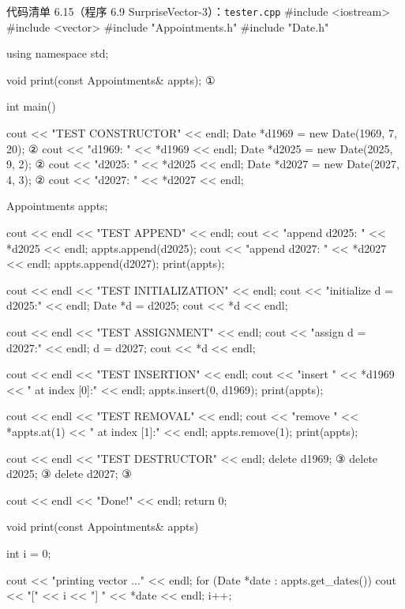 \begin{codeboxt}{代码清单 6.15（程序 6.9 SurpriseVector-3）：\texttt{tester.\allowbreak{}cpp}}
#include <iostream>
#include <vector>
#include "Appointments.h"
#include "Date.h"

using namespace std;

void print(const Appointments& appts);         ①

int main()
{
    cout << "TEST CONSTRUCTOR" << endl;
    Date *d1969 = new Date(1969,  7, 20);      ②
    cout << "d1969: " << *d1969 << endl;
    Date *d2025 = new Date(2025,  9,  2);      ②
    cout << "d2025: " << *d2025 << endl;
    Date *d2027 = new Date(2027,  4,  3);      ②
    cout << "d2027: " << *d2027 << endl;

    Appointments appts;

    cout << endl << "TEST APPEND" << endl;
    cout << "append d2025: " << *d2025 << endl;
    appts.append(d2025);
    cout << "append d2027: " << *d2027 << endl;
    appts.append(d2027);
    print(appts);

    cout << endl << "TEST INITIALIZATION" << endl;
    cout << "initialize d = d2025:" << endl;
    Date *d = d2025;
    cout << *d << endl;

    cout << endl << "TEST ASSIGNMENT" << endl;
    cout << "assign d = d2027:" << endl;
    d = d2027;
    cout << *d << endl;

    cout << endl << "TEST INSERTION" << endl;
    cout << "insert " << *d1969
         << " at index [0]:" << endl;
    appts.insert(0, d1969);
    print(appts);

    cout << endl << "TEST REMOVAL" << endl;
    cout << "remove " << *appts.at(1)
         << " at index [1]:" << endl;
    appts.remove(1);
    print(appts);

    cout << endl << "TEST DESTRUCTOR" << endl;
    delete d1969;                              ③
    delete d2025;                              ③
    delete d2027;                              ③

    cout << endl << "Done!" << endl;
    return 0;
}

void print(const Appointments& appts)
{
    int i = 0;

    cout << "printing vector ..." << endl;
    for (Date *date : appts.get_dates())
    {
        cout << "[" << i << "] " << *date << endl;
        i++;
    }
}
\end{codeboxt}
\par
{}\par
{}\par

